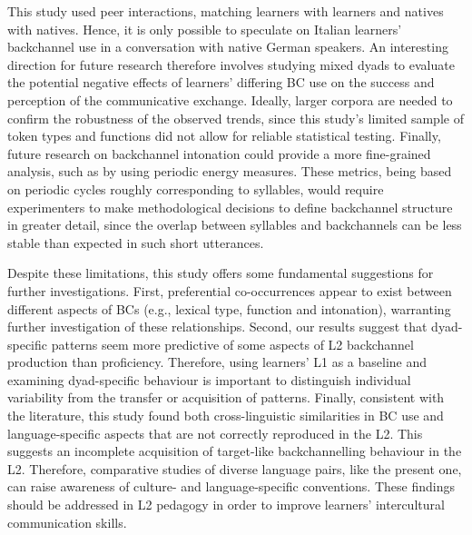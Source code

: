 \begin{styleStandard}
This study used peer interactions, matching learners with learners and natives with natives. Hence, it is only possible to speculate on Italian learners’ backchannel use in a conversation with native German speakers. An interesting direction for future research therefore involves studying mixed dyads to evaluate the potential negative effects of learners’ differing BC use on the success and perception of the communicative exchange. Ideally, larger corpora are needed to confirm the robustness of the observed trends, since this study’s limited sample of token types and functions did not allow for reliable statistical testing. Finally, future research on backchannel intonation could provide a more fine-grained analysis, such as by using periodic energy measures. These metrics, being based on periodic cycles roughly corresponding to syllables, would require experimenters to make methodological decisions to define backchannel structure in greater detail, since the overlap between syllables and backchannels can be less stable than expected in such short utterances.
\end{styleStandard}

\begin{styleStandard}
Despite these limitations, this study offers some fundamental suggestions for further investigations. First, preferential co-occurrences appear to exist between different aspects of BCs (e.g., lexical type, function and intonation), warranting further investigation of these relationships. Second, our results suggest that dyad-specific patterns seem more predictive of some aspects of L2 backchannel production than proficiency. Therefore, using learners’ L1 as a baseline and examining dyad-specific behaviour is important to distinguish individual variability from the transfer or acquisition of patterns. Finally, consistent with the literature, this study found both cross-linguistic similarities in BC use and language-specific aspects that are not correctly reproduced in the L2. This suggests an incomplete acquisition of target-like backchannelling behaviour in the L2. Therefore, comparative studies of diverse language pairs, like the present one, can raise awareness of culture- and language-specific conventions. These findings should be addressed in L2 pedagogy in order to improve learners’ intercultural communication skills.
\end{styleStandard}

